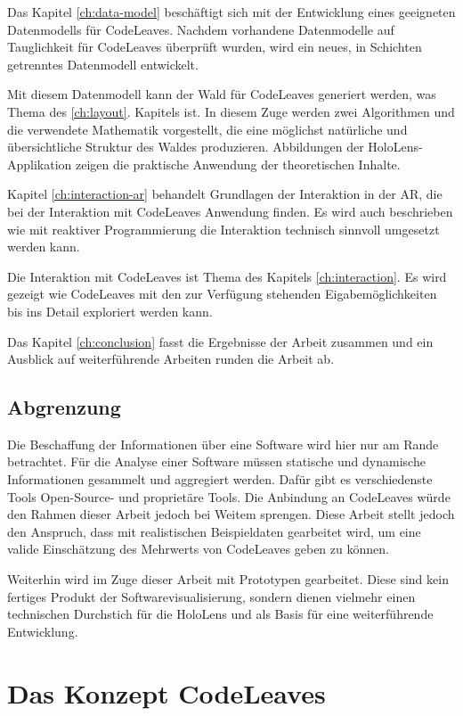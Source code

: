Das Kapitel \ref{ch:data-model} beschäftigt sich mit der Entwicklung eines geeigneten Datenmodells für CodeLeaves. Nachdem vorhandene Datenmodelle auf Tauglichkeit für CodeLeaves überprüft wurden, wird ein neues, in Schichten getrenntes Datenmodell entwickelt.

Mit diesem Datenmodell kann der Wald für CodeLeaves generiert werden, was Thema des \ref{ch:layout}. Kapitels ist. In diesem Zuge werden zwei Algorithmen und die verwendete Mathematik vorgestellt, die eine möglichst natürliche und übersichtliche Struktur des Waldes produzieren. Abbildungen der HoloLens-Applikation zeigen die praktische Anwendung der theoretischen Inhalte.

Kapitel \ref{ch:interaction-ar} behandelt Grundlagen der Interaktion in der AR, die bei der Interaktion mit CodeLeaves Anwendung finden. Es wird auch beschrieben wie mit reaktiver Programmierung die Interaktion technisch sinnvoll umgesetzt werden kann.

Die Interaktion mit CodeLeaves ist Thema des Kapitels \ref{ch:interaction}. Es wird gezeigt wie CodeLeaves mit den zur Verfügung stehenden Eigabemöglichkeiten bis ins Detail exploriert werden kann.

Das Kapitel \ref{ch:conclusion} fasst die Ergebnisse der Arbeit zusammen und ein Ausblick auf weiterführende Arbeiten runden die Arbeit ab.

\section{Abgrenzung}
\label{sec:distinction}

Die Beschaffung der Informationen über eine Software wird hier nur am Rande betrachtet. Für die Analyse einer Software müssen statische und dynamische Informationen gesammelt und aggregiert werden. Dafür gibt es verschiedenste Tools Open-Source- und proprietäre Tools. Die Anbindung an CodeLeaves würde den Rahmen dieser Arbeit jedoch bei Weitem sprengen. Diese Arbeit stellt jedoch den Anspruch, dass mit realistischen Beispieldaten gearbeitet wird, um eine valide Einschätzung des Mehrwerts von CodeLeaves geben zu können.

Weiterhin wird im Zuge dieser Arbeit mit Prototypen gearbeitet. Diese sind kein fertiges Produkt der Softwarevisualisierung, sondern dienen vielmehr einen technischen Durchstich für die HoloLens und als Basis für eine weiterführende Entwicklung.

\chapter{Das Konzept CodeLeaves}
\label{ch:concept}

